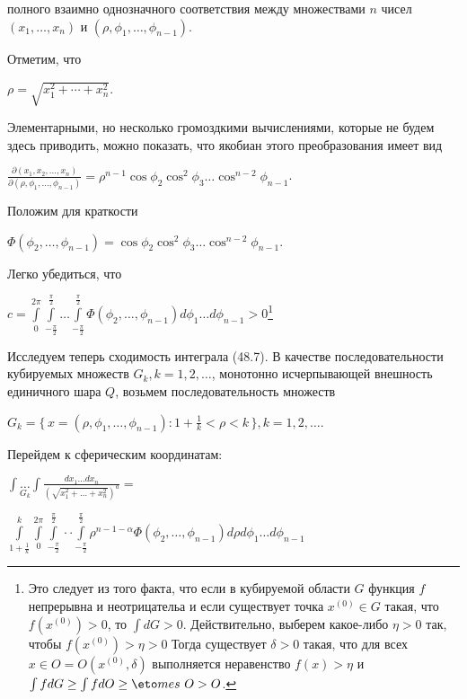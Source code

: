 ﻿\documentclass[twocolumn,a4paper]{article}
\begin{document}

полного взаимно однозначного соответствия между множествами $n$ чисел $(x_1,\ldots,x_n)$ и $(\rho,\phi_1,\ldots,\phi_{n-1})$.

Отметим, что
\begin{center}
$\rho = \sqrt{x_1^2+\cdots+x_n^2}$.
\end{center}
Элементарными, но несколько громоздкими вычислениями, которые не будем здесь приводить, можно показать, что якобиан этого преобразования имеет вид
\begin{center}
$\frac{\partial(x_1,x_2,\ldots,x_n)}{\partial(\rho,\phi_1,\ldots,\phi_{n-1})} = \rho^{n-1}\cos{\phi_2}\cos^2{\phi_3}\ldots\cos^{n-2}{\phi_{n-1}}$.
\end{center}
Положим для краткости
\begin{center}
$\Phi(\phi_2,\ldots,\phi_{n-1}) = \cos{\phi_2}\cos^2{\phi_3\ldots\cos^{n-2}{\phi_{n-1}}}$.
\end{center}
Легко убедиться, что
\begin{center}
$c = \int\limits_0^{2\pi} \int\limits_{-\frac{\pi}{2}}^{\frac{\pi}{2}}\ldots\int\limits_{-\frac{\pi}{2}}^{\frac{\pi}{2}} \Phi(\phi_2,\ldots,\phi_{n-1})d\phi_1\ldots d\phi_{n-1} > 0$\footnote[1]{%
Это следует из того факта, что если в кубируемой области $G$ функция $f$ непрерывна и неотрицательа и если существует точка $x^{(0)}\in G$ такая, что $f(x^{(0)}) > 0$, то $\int dG > 0$. Действительно, выберем какое-либо $\eta > 0$ так, чтобы $f(x^{(0)}) > \eta > 0$  Тогда существует $\delta > 0$ такая, что для всех $x \in O = O(x^{(0)}, \delta)$ выполняется неравенство $f(x) > \eta$ и $\int fdG \geq \int fdO \geq \eto mes\ O > O$.}
\end{center}

Исследуем теперь сходимость интеграла (48.7). В качестве последовательности кубируемых множеств $G_k, k = 1, 2,\ldots$,
монотонно исчерпывающей внешность единичного шара $Q$, возьмем последовательность множеств
\begin{center}
$G_k = \{\,x = (\rho,\phi_1,\ldots,\phi_{n-1}):1 + \frac1k < \rho < k\,\}, k = 1,2,\ldots$.
\end{center}
Перейдем к сферическим координатам:
\begin{center}
$\int \underset{G_k}{\ldots} \int\frac{dx_1\ldots dx_n}{(\sqrt{x^2_1+\ldots +x^2_n})^a} = $
\end{center}
\begin{center}
$\int\limits^k_{1 + \frac1k}\int\limits_0^{2\pi}\int\limits_{-\frac{\pi}{2}}^{\frac{\pi}{2}}\cdot \cdot \int\limits_{-\frac{\pi}{2}}^{\frac{\pi}{2}}\rho^{n-1-\alpha}\Phi(\phi_2,\ldots,\phi_{n-1})d\rho d\phi_1\ldots d\phi_{n-1}$
\end{center}
\end{document}
